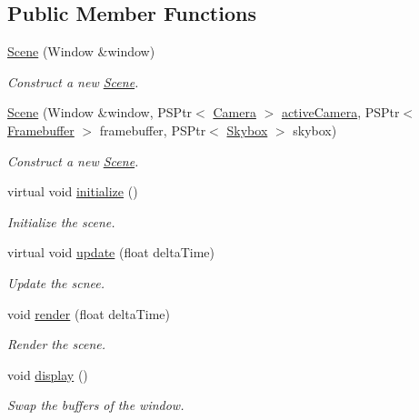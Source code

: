 \subsection*{Public Member Functions}
\begin{DoxyCompactItemize}
\item 
\mbox{\hyperlink{classprz_1_1_scene_a99d23e99f8f47fdf4e6bd698d7615121}{Scene}} (Window \&window)
\begin{DoxyCompactList}\small\item\em Construct a new \mbox{\hyperlink{classprz_1_1_scene}{Scene}}. \end{DoxyCompactList}\item 
\mbox{\hyperlink{classprz_1_1_scene_aad3da8080dd5063fc76f94285b027e13}{Scene}} (Window \&window, P\+S\+Ptr$<$ \mbox{\hyperlink{classprz_1_1_camera}{Camera}} $>$ \mbox{\hyperlink{classprz_1_1_scene_a19077419381d6e278ca13abf7f8eb69c}{active\+Camera}}, P\+S\+Ptr$<$ \mbox{\hyperlink{classprz_1_1_framebuffer}{Framebuffer}} $>$ framebuffer, P\+S\+Ptr$<$ \mbox{\hyperlink{classprz_1_1_skybox}{Skybox}} $>$ skybox)
\begin{DoxyCompactList}\small\item\em Construct a new \mbox{\hyperlink{classprz_1_1_scene}{Scene}}. \end{DoxyCompactList}\item 
virtual void \mbox{\hyperlink{classprz_1_1_scene_ad8ae9e750f1d233f7026cba59241f419}{initialize}} ()
\begin{DoxyCompactList}\small\item\em Initialize the scene. \end{DoxyCompactList}\item 
virtual void \mbox{\hyperlink{classprz_1_1_scene_a19ade334f3e3ecf0cf0ace488963ef00}{update}} (float delta\+Time)
\begin{DoxyCompactList}\small\item\em Update the scnee. \end{DoxyCompactList}\item 
void \mbox{\hyperlink{classprz_1_1_scene_a1744d861904b1cb0177c913e60911089}{render}} (float delta\+Time)
\begin{DoxyCompactList}\small\item\em Render the scene. \end{DoxyCompactList}\item 
void \mbox{\hyperlink{classprz_1_1_scene_a7bf265c1a9266e2685a81687ba8380f2}{display}} ()
\begin{DoxyCompactList}\small\item\em Swap the buffers of the window. \end{DoxyCompactList}\item 

\end{DoxyCompactItemize}
